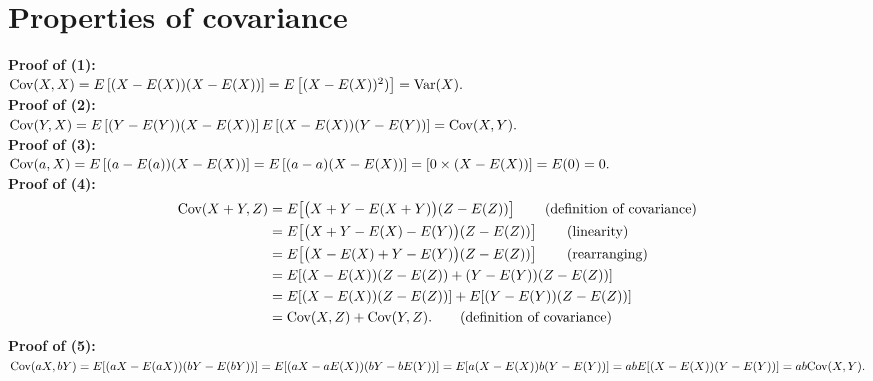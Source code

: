 \section{Properties of covariance} \label{properties of covariance sec}

  	\bigskip
	
	\hfil{}
	\bigskip

\noindent \textbf{Proof of (1):} \\
$\text{Cov}(X,X) = E\left[(X - E(X))(X - E(X))\right] = E\left[(X - E(X))^2)\right] = \text{Var}(X).$ \\
\noindent \textbf{Proof of (2):} \\
$\text{Cov}(Y,X) = E\left[(Y - E(Y))(X - E(X))\right] E\left[(X - E(X))(Y - E(Y))\right] = \text{Cov}(X,Y).$ \\
\noindent \textbf{Proof of \! (3):} \\
$\text{Cov}(a,X) = E\left[(a - E(a))(X - E(X))\right] = E\left[(a - a)(X - E(X))\right] = \left[0\times(X - E(X))\right] = E(0) = 0.$ \\
\noindent \textbf{Proof of (4):}
\begin{align*}
\text{Cov}(X + Y,Z) & = E\!\left[\boldsymbol{\big{(}}X + Y - E(X + Y)\boldsymbol{\big{)}}(Z - E(Z))\right] \tag{definition of covariance} \\
	& = E\!\left[\boldsymbol{\big{(}}X + Y - E(X) - E(Y)\boldsymbol{\big{)}}(Z - E(Z))\right] \tag{linearity} \\
	& = E\!\left[\boldsymbol{\big{(}}X - E(X) + Y - E(Y)\boldsymbol{\big{)}}(Z - E(Z))\right] \tag{rearranging} \\
	& = E\!\left[(X - E(X))(Z - E(Z)) + (Y - E(Y))(Z - E(Z))\right] \\
	& =  E\!\left[(X - E(X))(Z - E(Z))\right] + E\!\left[(Y - E(Y))(Z - E(Z))\right] \\
	& = \text{Cov}(X,Z) + \text{Cov}(Y,Z). \tag{definition of covariance}
\end{align*}
\noindent\textbf{Proof of (5):} \\
$\text{Cov}(aX,bY) =  E\!\left[(aX - E(aX))(bY - E(bY))\right] =  E\!\left[(aX - aE(X))(bY - bE(Y))\right] =  E\!\left[a(X - E(X))b(Y - E(Y))\right] =  abE\!\left[(X - E(X))(Y - E(Y))\right] = ab\text{Cov}(X,Y).$

